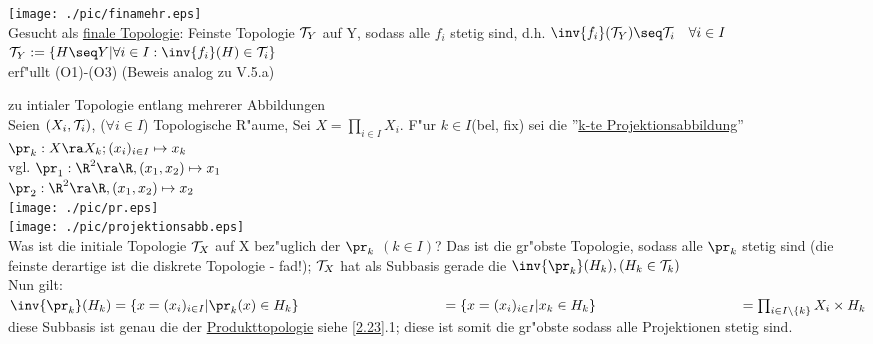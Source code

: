 \begin{minipage}{7cm}
\texttt{[image: ./pic/finamehr.eps]}\\
Gesucht als \ul{finale Topologie}: Feinste Topologie $\mathcal T_Y$ auf Y, sodass alle $f_i$ stetig sind, d.h. $\inv{f_i}(\T_Y)\seq\T_i\quad\forall i\in I$\\
$\T_Y:=\{ H\seq Y|\forall i\in I:\inv{f_i}(H)\in\T_i\}$\\
erf"ullt (O1)-(O3) (Beweis analog zu V.5.a)\vspace*{4.8cm}\\
\end{minipage}

\begin{beispiel}\label{5.6}zu intialer Topologie entlang mehrerer Abbildungen\\
Seien $(X_i,\mathcal T_i)$, ($\forall i\in I$) Topologische R"aume, Sei $X=\prod_{i\in I}X_i$. F"ur $k\in I$(bel, fix) sei die ''\ul{k-te Projektionsabbildung}'' $\pr_k: X\ra X_k; (x_i)_{i\in I}\mapsto x_k$\vspace*{1cm}\\
vgl. $\pr_1:\R^2\ra\R ,(x_1,x_2)\mapsto x_1$\\
$\pr_2:\R^2\ra\R ,(x_1,x_2)\mapsto x_2$\vspace*{-2cm}\\
\hspace*{5.5cm}\texttt{[image: ./pic/pr.eps]}\\
\texttt{[image: ./pic/projektionsabb.eps]}\\
Was ist die initiale Topologie $\mathcal T_X$ auf X bez"uglich der $\pr_k$ $(k\in I)$? Das ist die gr"obste Topologie, sodass alle $\pr_k$ stetig sind (die feinste derartige ist die diskrete Topologie - fad!); $\mathcal T_X$ hat als Subbasis gerade die $\inv{\pr_k}(H_k), (H_k\in\T_k)$\\
Nun gilt:\\
\hspace*{2cm}$\inv{\pr_k}(H_k)=\{x=(x_i)_{i\in I}|\pr_k(x)\in H_k\}\\
\hspace*{3.6cm}=\{x=(x_i)_{i\in I}|x_k\in H_k\}\\
\hspace*{3.6cm}=\prod_{i\in I\setminus\{k\}}X_i\times H_k$\\
diese Subbasis ist genau die der \ul{Produkttopologie} siehe \ref{2.23}.1; diese ist somit die gr"obste sodass alle Projektionen stetig sind.
\end{beispiel} 
